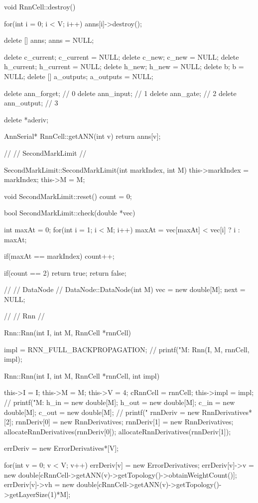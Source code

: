 void RnnCell::destroy(){
    for(int i = 0; i < V; i++){
      anns[i]->destroy();
    }

   delete [] anns;
   anns = NULL;


  delete c_current;
  c_current = NULL;
  delete c_new;
  c_new = NULL;
  delete h_current;
  h_current = NULL;
  delete h_new;
  h_new = NULL;
  delete b;
  b = NULL;
  delete [] a_outputs;
  a_outputs = NULL;

  delete ann_forget; // 0
  delete ann_input; // 1
  delete ann_gate; // 2
  delete ann_output; // 3

  delete *aderiv;

}


AnnSerial* RnnCell::getANN(int v){
  return anns[v];
}


//
// SecondMarkLimit
//

SecondMarkLimit::SecondMarkLimit(int markIndex, int M){
  this->markIndex = markIndex;
  this->M = M;
}

void SecondMarkLimit::reset(){
  count = 0;
}

bool SecondMarkLimit::check(double *vec){
  int maxAt = 0;
  for(int i = 1; i < M; i++)
    maxAt = vec[maxAt] < vec[i] ? i : maxAt;

  if(maxAt == markIndex) count++;

  if(count == 2) return true;
  return false;
}


//
// DataNode
//
DataNode::DataNode(int M){
  vec = new double[M];
  next = NULL;
}

//
// Rnn
//

Rnn::Rnn(int I, int M, RnnCell *rnnCell){

  impl = RNN_FULL_BACKPROPAGATION;
  // printf("M:%
  Rnn(I, M, rnnCell, impl);
}

Rnn::Rnn(int I, int M, RnnCell *rnnCell, int impl){

  this->I = I;
  this->M = M;
  this->V = 4;
  cRnnCell = rnnCell;
  this->impl = impl;
  // printf("M:%
  h_in = new double[M];
  h_out = new double[M];
  c_in = new double[M];
  c_out = new double[M];
  // printf("%
  rnnDeriv = new RnnDerivatives*[2];
  rnnDeriv[0] = new RnnDerivatives;
  rnnDeriv[1] = new RnnDerivatives;
  allocateRnnDerivatives(rnnDeriv[0]);
  allocateRnnDerivatives(rnnDeriv[1]);

  errDeriv = new ErrorDerivatives*[V];

  for(int v = 0; v < V; v++){
    errDeriv[v] = new ErrorDerivatives;
    errDeriv[v]->v = new double[cRnnCell->getANN(v)->getTopology()->obtainWeightCount()];
    errDeriv[v]->vh = new double[cRnnCell->getANN(v)->getTopology()->getLayerSize(1)*M];
  }
}

